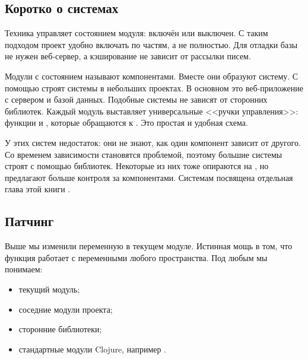 \subsection{Коротко о системах}


\label{systems-intro}

Техника  управляет состоянием модуля: включён или
выключен. С таким подходом проект удобно включать по частям, а не полностью. Для
отладки базы не нужен веб-сервер, а кэширование не зависит от рассылки писем.

Модули с состоянием называют компонентами. Вместе они образуют систему. С
помощью  строят системы в небольших проектах. В основном
это веб-приложение с сервером и базой данных. Подобные системы не зависят от
сторонних библиотек. Каждый модуль выставляет универсальные <<ручки
управления>>: функции  и , которые обращаются к
. Это простая и удобная схема.

У этих систем недостаток: они не знают, как один компонент зависит от
другого. Со временем зависимости становятся проблемой, поэтому большие системы
строят с помощью библиотек. Некоторые из них тоже опираются на
, но предлагают больше контроля за компонентами. Системам
посвящена отдельная глава этой книги .

\subsection{Патчинг}


Выше мы изменили переменную в текущем модуле. Истинная мощь
 в том, что функция работает с переменными любого
пространства. Под любым мы понимаем:

\begin{itemize}

\item
  текущий модуль;

\item
  соседние модули проекта;

\item
  сторонние библиотеки;

\item
  стандартные модули Clojure, например .

\end{itemize}

